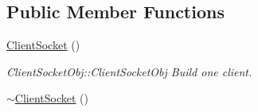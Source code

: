 \subsection*{Public Member Functions}
\begin{DoxyCompactItemize}
\item 
\hypertarget{class_client_socket_aa452c26d330984ce23eb98fba8e59c6a}{\hyperlink{class_client_socket_aa452c26d330984ce23eb98fba8e59c6a}{Client\-Socket} ()}\label{class_client_socket_aa452c26d330984ce23eb98fba8e59c6a}

\begin{DoxyCompactList}\small\item\em Client\-Socket\-Obj\-::\-Client\-Socket\-Obj Build one client. \end{DoxyCompactList}\item 
\hypertarget{class_client_socket_aef5d9c1c9b443124b820521276b175ca}{\hyperlink{class_client_socket_aef5d9c1c9b443124b820521276b175ca}{$\sim$\-Client\-Socket} ()}\label{class_client_socket_aef5d9c1c9b443124b820521276b175ca}


\end{DoxyCompactItemize}
